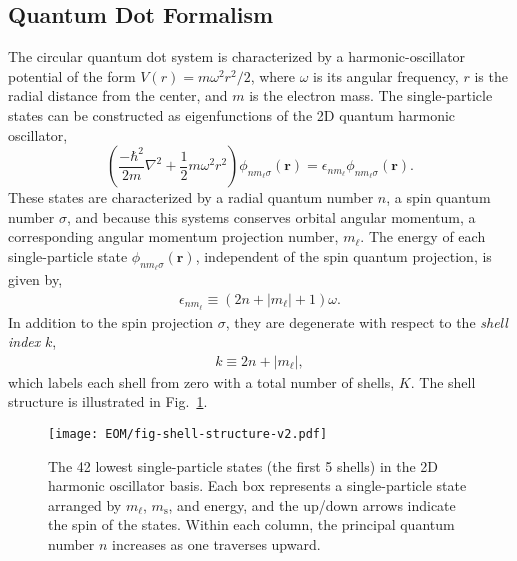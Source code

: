 \documentclass[thesis.tex]{subfiles}
\begin{document}
\subsection{Quantum Dot Formalism}

The circular quantum dot system is characterized by a harmonic-oscillator potential of the form $V(r) = m \omega^2r^2 / 2$, where $\omega$ is its angular frequency, $r$ is the radial distance from the center, and $m$ is the electron mass.  The single-particle states can be constructed as eigenfunctions of the 2D quantum harmonic oscillator,
\begin{equation} \label{eq:2d_ho}
  \left(\frac{-\hbar^{2}}{2m}\nabla^{2} + \frac{1}{2} m\omega^{2}r^{2}\right)\phi_{n m_{\ell} \sigma}(\mathbf{r}) = \epsilon_{n m_{\ell}}\phi_{n m_{\ell} \sigma}(\mathbf{r}).
\end{equation}
These states are characterized by a radial quantum number $n$, a spin quantum number $\sigma$, and because this systems conserves orbital angular momentum, a corresponding angular momentum projection number, $m_{\ell}$.  The energy of each single-particle state $\phi_{n m_{\ell} \sigma}(\mathbf{r})$, independent of the spin quantum projection, is given by,
\begin{align} \label{eq:energysingleparticlestate}
  \epsilon_{n m_{\ell}} \equiv (2 n + |m_\ell| + 1) \omega.
\end{align}
In addition to the spin projection $\sigma$, they are degenerate with respect to the \textit{shell index} $k$,
\begin{align} \label{eq:shell_index}
  k \equiv 2 n + |m_\ell|,
\end{align}
which labels each shell from zero with a total number of shells, $K$.  The shell structure is illustrated in Fig.\ \ref{fig:qd-shell-structure}.
\begin{figure}[h]
  \centering
  \texttt{[image: EOM/fig-shell-structure-v2.pdf]}
  \caption{The 42 lowest single-particle states (the first 5 shells) in the 2D harmonic oscillator basis.  Each box represents a single-particle state arranged by $m_\ell$, $m_{\mathrm{s}}$, and energy, and the up/down arrows indicate the spin of the states.  Within each column, the principal quantum number $n$ increases as one traverses upward.}
  \label{fig:qd-shell-structure}
\end{figure}
\end{document}
